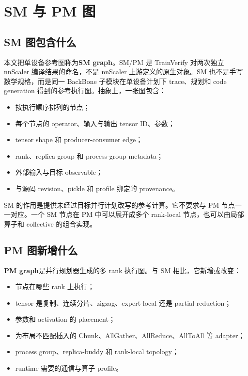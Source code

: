 \documentclass[10.5pt,a4paper]{ctexart}
\newcommand{\term}[1]{\textbf{#1}}
\begin{document}
\section{SM 与 PM 图}

\subsection{SM 图包含什么}

本文把单设备参考图称为\term{SM graph}。SM/PM 是 TrainVerify 对两次独立 nnScaler 编译结果的命名，不是 nnScaler 上游定义的原生对象。SM 也不是手写数学规格，而是同一 BackBone 子模块在单设备计划下 trace、规划和 code generation 得到的参考执行图。抽象上，一张图包含：
\begin{itemize}
  \item 按执行顺序排列的节点；
  \item 每个节点的 operator、输入与输出 tensor ID、参数；
  \item tensor shape 和 producer-consumer edge；
  \item rank、replica group 和 process-group metadata；
  \item 外部输入与目标 observable；
  \item 与源码 revision、pickle 和 profile 绑定的 provenance。
\end{itemize}

SM 的作用是提供未经过目标并行计划改写的参考计算。它不要求与 PM 节点一一对应。一个 SM 节点在 PM 中可以展开成多个 rank-local 节点，也可以由局部算子和 collective 的组合实现。

\subsection{PM 图新增什么}

\term{PM graph}是并行规划器生成的多 rank 执行图。与 SM 相比，它新增或改变：
\begin{itemize}
  \item 节点在哪些 rank 上执行；
  \item tensor 是复制、连续分片、zigzag、expert-local 还是 partial reduction；
  \item 参数和 activation 的 placement；
  \item 为布局不匹配插入的 Chunk、AllGather、AllReduce、AllToAll 等 adapter；
  \item process group、replica-buddy 和 rank-local topology；
  \item runtime 需要的通信与算子 profile。
\end{itemize}
\end{document}
